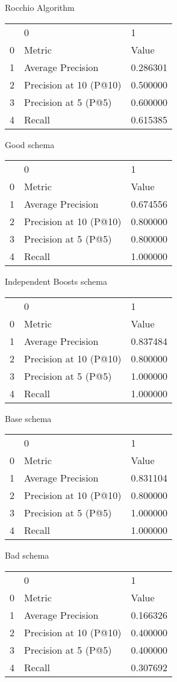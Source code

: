 

Rocchio Algorithm
\begin{tabular}{lll}
 & 0 & 1 \\
0 & Metric & Value \\
1 & Average Precision & 0.286301 \\
2 & Precision at 10 (P@10) & 0.500000 \\
3 & Precision at 5 (P@5) & 0.600000 \\
4 & Recall & 0.615385 \\
\end{tabular}


Good schema
\begin{tabular}{lll}
 & 0 & 1 \\
0 & Metric & Value \\
1 & Average Precision & 0.674556 \\
2 & Precision at 10 (P@10) & 0.800000 \\
3 & Precision at 5 (P@5) & 0.800000 \\
4 & Recall & 1.000000 \\
\end{tabular}


Independent Boosts schema
\begin{tabular}{lll}
 & 0 & 1 \\
0 & Metric & Value \\
1 & Average Precision & 0.837484 \\
2 & Precision at 10 (P@10) & 0.800000 \\
3 & Precision at 5 (P@5) & 1.000000 \\
4 & Recall & 1.000000 \\
\end{tabular}


Base schema
\begin{tabular}{lll}
 & 0 & 1 \\
0 & Metric & Value \\
1 & Average Precision & 0.831104 \\
2 & Precision at 10 (P@10) & 0.800000 \\
3 & Precision at 5 (P@5) & 1.000000 \\
4 & Recall & 1.000000 \\
\end{tabular}


Bad schema
\begin{tabular}{lll}
 & 0 & 1 \\
0 & Metric & Value \\
1 & Average Precision & 0.166326 \\
2 & Precision at 10 (P@10) & 0.400000 \\
3 & Precision at 5 (P@5) & 0.400000 \\
4 & Recall & 0.307692 \\
\end{tabular}
